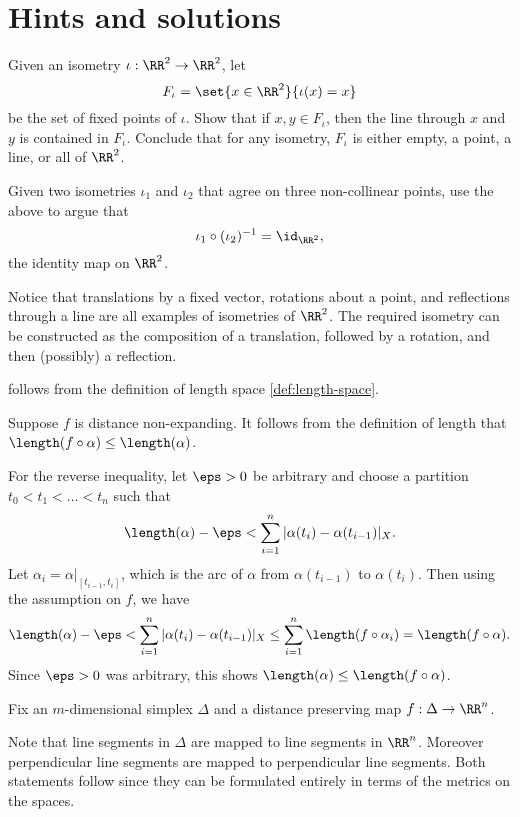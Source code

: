 \section*{Hints and solutions}

Given an isometry $\iota: \RR^2 \to \RR^2$, let
$$F_{\iota} = \set{x \in \RR^2}{\iota(x) = x}$$ be the set of fixed points of $\iota$.  Show that if $x, y \in F_{\iota}$, then the line through $x$ and $y$ is contained in $F_{\iota}$.  Conclude that for any isometry, $F_{\iota}$ is either empty, a point, a line, or all of $\RR^2$.

Given two isometries $\iota_1$ and $\iota_2$ that agree on three non-collinear points, use the above to argue that
$$\iota_1 \circ (\iota_2)^{-1} = \id_{\RR^2},$$ the identity map on $\RR^2$.


Notice that translations by a fixed vector, rotations about a point, and reflections through a line are all examples of isometries of $\RR^2$.  The required isometry can be constructed as the composition of a translation, followed by a rotation, and then (possibly) a reflection.

 follows from the definition of length space \ref{def:length-space}.

\parbf{(\ref{LP=>short:b})}
Suppose $f$ is distance non-expanding.  
It follows from the definition of length that $\length(f\circ \alpha) \le \length(\alpha)$.

For the reverse inequality, let $\eps > 0$ be arbitrary and choose a partition $t_0 < t_1 < \dots < t_n$ such that
$$\length(\alpha) - \eps < \sum_{i=1}^n |\alpha(t_i) - \alpha(t_{i-1})|_X.$$
Let $\alpha_i = \alpha|_{[t_{i-1}, t_i]}$, which is the arc of $\alpha$ from $\alpha(t_{i-1})$ to $\alpha(t_i)$.  Then using the assumption on $f$, we have
$$\length(\alpha) - \eps 
<
\sum_{i=1}^n |\alpha(t_i) - \alpha(t_{i-1})|_X \le \sum_{i=1}^n \length(f \circ \alpha_i) = \length(f\circ \alpha).$$  
Since $\eps >0$ was arbitrary, this shows $\length(\alpha) \le \length (f \circ \alpha)$.


Fix an $m$-dimensional simplex $\Delta$ and a distance preserving map $f: \Delta \to \RR^n$.

Note that line segments in $\Delta$ are mapped to line segments in $\RR^n$.
Moreover perpendicular line segments are mapped to perpendicular line segments.
Both statements follow since they can be formulated entirely in terms of the metrics on the spaces.

